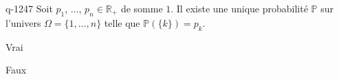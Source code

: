 \begin{truefalse}{q-1247}
Soit $p_1$, ..., $p_n\in\mathbb{R}_+$ de somme $1$. Il existe une unique probabilité $\mathbb{P}$ sur l'univers $\Omega=\{1,\ldots,n\}$ telle que $\mathbb{P}(\{k\})=p_k$.
\item* Vrai
\item Faux
\end{truefalse}

